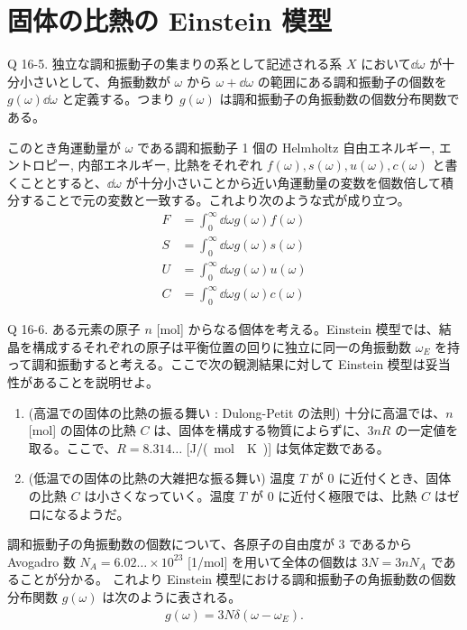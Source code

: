 \documentclass[uplatex,dvipdfmx,a4paper,11pt]{jlreq}
\theoremstyle{definition}
\begin{document}
\section{固体の比熱の Einstein 模型}
\begin{itembox}[l]{Q 16-5.}
  独立な調和振動子の集まりの系として記述される系 $X$ において$\dd{\omega}$ が十分小さいとして、角振動数が $\omega$ から $\omega + \dd{\omega}$ の範囲にある調和振動子の個数を $g(\omega)\dd{\omega}$ と定義する。つまり $g(\omega)$ は調和振動子の角振動数の個数分布関数である。
\end{itembox}
このとき角運動量が $\omega$ である調和振動子 1 個の Helmholtz 自由エネルギー, エントロピー, 内部エネルギー, 比熱をそれぞれ $f(\omega), s(\omega), u(\omega), c(\omega)$ と書くこととすると、$\dd{\omega}$ が十分小さいことから近い角運動量の変数を個数倍して積分することで元の変数と一致する。これより次のような式が成り立つ。
\begin{align}
  F & = \int_0^\infty\dd{\omega}g(\omega)f(\omega) \\
  S & = \int_0^\infty\dd{\omega}g(\omega)s(\omega) \\
  U & = \int_0^\infty\dd{\omega}g(\omega)u(\omega) \\
  C & = \int_0^\infty\dd{\omega}g(\omega)c(\omega)
\end{align}

\begin{itembox}[l]{Q 16-6.}
  ある元素の原子 $n$ [\si{mol}] からなる個体を考える。Einstein 模型では、結晶を構成するそれぞれの原子は平衡位置の回りに独立に同一の角振動数 $\omega_E$ を持って調和振動すると考える。ここで次の観測結果に対して Einstein 模型は妥当性があることを説明せよ。
  \begin{enumerate}
    \item (高温での固体の比熱の振る舞い : Dulong-Petit の法則) 十分に高温では、$n$ [\si{mol}] の固体の比熱 $C$ は、固体を構成する物質によらずに、$3nR$ の一定値を取る。ここで、$R = 8.314\ldots$ [\si{J/(mol\cdot K)}] は気体定数である。
    \item (低温での固体の比熱の大雑把な振る舞い) 温度 $T$ が $0$ に近付くとき、固体の比熱 $C$ は小さくなっていく。温度 $T$ が $0$ に近付く極限では、比熱 $C$ はゼロになるようだ。
  \end{enumerate}
\end{itembox}
調和振動子の角振動数の個数について、各原子の自由度が $3$ であるから Avogadro 数 $N_A = 6.02\ldots\times 10^{23}$ [\si{1/mol}] を用いて全体の個数は $3N = 3nN_A$ であることが分かる。
これより Einstein 模型における調和振動子の角振動数の個数分布関数 $g(\omega)$ は次のように表される。
\begin{align}
  g(\omega) = 3N\delta(\omega - \omega_E).
\end{align}
\end{document}
